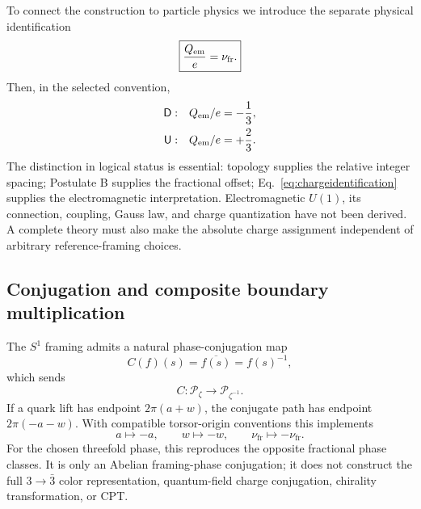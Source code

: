 \documentclass[aps,prd,reprint,superscriptaddress,nofootinbib,longbibliography,floatfix]{revtex4-2}
\newcommand{\Ustate}{\mathsf{U}}
\newcommand{\Dstate}{\mathsf{D}}
\newcommand{\nufr}{\nu_{\mathrm{fr}}}
\begin{document}
To connect the construction to particle physics we introduce the separate physical identification
\begin{equation}
\boxed{\frac{Q_{\rm em}}{e}=\nufr.}
\label{eq:chargeidentification}
\end{equation}
Then, in the selected convention,
\begin{align}
\Dstate:&\quad Q_{\rm em}/e=-\frac13,
\label{eq:Dcharge}\\
\Ustate:&\quad Q_{\rm em}/e=+\frac23.
\label{eq:Ucharge}
\end{align}
The distinction in logical status is essential: topology supplies the relative integer spacing; Postulate B supplies the fractional offset; Eq.~\eqref{eq:chargeidentification} supplies the electromagnetic interpretation. Electromagnetic $U(1)$, its connection, coupling, Gauss law, and charge quantization have not been derived. A complete theory must also make the absolute charge assignment independent of arbitrary reference-framing choices.

\subsection{Conjugation and composite boundary multiplication}

The $S^1$ framing admits a natural phase-conjugation map
\begin{equation}
C(f)(s)=\overline{f(s)}=f(s)^{-1},
\label{eq:conjugation}
\end{equation}
which sends
\begin{equation}
C:\mathcal P_\zeta\longrightarrow\mathcal P_{\zeta^{-1}}.
\label{eq:Cmap}
\end{equation}
If a quark lift has endpoint $2\pi(a+w)$, the conjugate path has endpoint $2\pi(-a-w)$. With compatible torsor-origin conventions this implements
\begin{equation}
a\mapsto-a,
\qquad
w\mapsto-w,
\qquad
\nufr\mapsto-\nufr.
\label{eq:conjugatelift}
\end{equation}
For the chosen threefold phase, this reproduces the opposite fractional phase classes. It is only an Abelian framing-phase conjugation; it does not construct the full $3\to\bar3$ color representation, quantum-field charge conjugation, chirality transformation, or CPT.
\end{document}
